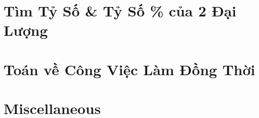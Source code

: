 \documentclass{article}
\begin{document}

\section{Tìm Tỷ Số \& Tỷ Số \% của 2 Đại Lượng}


\section{Toán về Công Việc Làm Đồng Thời}


\section{Miscellaneous}


\printbibliography[heading=bibintoc]
	
\end{document}
